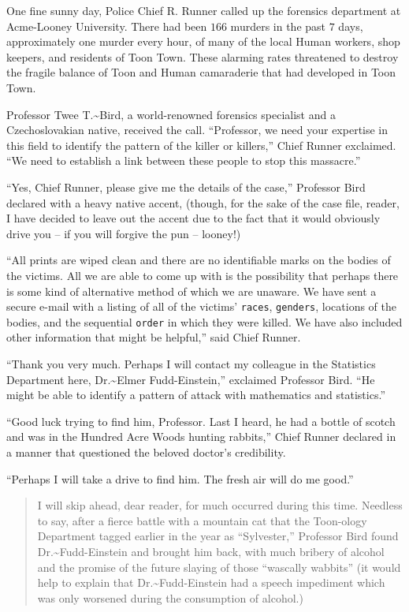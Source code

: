 \documentclass[captions=tableheading]{scrbook}
\begin{document}
One fine sunny day, Police Chief R. Runner called up the forensics department at Acme-Looney University. There had been \(  166 \) murders in the past \(  7 \) days, approximately one murder every hour, of many of the local Human workers, shop keepers, and residents of Toon Town. These alarming rates threatened to destroy the fragile balance of Toon and Human camaraderie that had developed in Toon Town. 

Professor Twee T.\~{}Bird, a world-renowned forensics specialist and a Czechoslovakian native, received the call. “Professor, we need your expertise in this field to identify the pattern of the killer or killers,” Chief Runner exclaimed. “We need to establish a link between these people to stop this massacre.” 

“Yes, Chief Runner, please give me the details of the case,” Professor Bird declared with a heavy native accent, (though, for the sake of the case file, reader, I have decided to leave out the accent due to the fact that it would obviously drive you -- if you will forgive the pun -- looney!) 

“All prints are wiped clean and there are no identifiable marks on the bodies of the victims. All we are able to come up with is the possibility that perhaps there is some kind of alternative method of which we are unaware. We have sent a secure e-mail with a listing of all of the victims’ \texttt{races}, \texttt{genders}, locations of the bodies, and the sequential \texttt{order} in which they were killed. We have also included other information that might be helpful,” said Chief Runner.

“Thank you very much. Perhaps I will contact my colleague in the Statistics Department here, Dr.\~{}Elmer Fudd-Einstein,” exclaimed Professor Bird. “He might be able to identify a pattern of attack with mathematics and statistics.”

“Good luck trying to find him, Professor. Last I heard, he had a bottle of scotch and was in the Hundred Acre Woods hunting rabbits,” Chief Runner declared in a manner that questioned the beloved doctor’s credibility. 

“Perhaps I will take a drive to find him. The fresh air will do me good.”

\begin{quote}
\noindent I will skip ahead, dear reader, for much occurred during this time. Needless to say, after a fierce battle with a mountain cat that the Toon-ology Department tagged earlier in the year as “Sylvester,” Professor Bird found Dr.\~{}Fudd-Einstein and brought him back, with much bribery of alcohol and the promise of the future slaying of those “wascally wabbits” (it would help to explain that Dr.\~{}Fudd-Einstein had a speech impediment which was only worsened during the consumption of alcohol.)
\end{quote}
\end{document}
